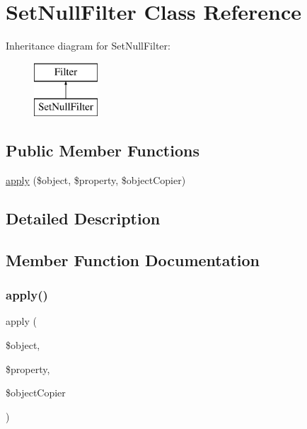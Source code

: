 \hypertarget{class_deep_copy_1_1_filter_1_1_set_null_filter}{}\section{Set\+Null\+Filter Class Reference}
\label{class_deep_copy_1_1_filter_1_1_set_null_filter}
Inheritance diagram for Set\+Null\+Filter\+:\begin{figure}[H]
\begin{center}
\leavevmode
\includegraphics[height=2.000000cm]{class_deep_copy_1_1_filter_1_1_set_null_filter}
\end{center}
\end{figure}
\subsection*{Public Member Functions}
\begin{DoxyCompactItemize}
\item 
\mbox{\hyperlink{class_deep_copy_1_1_filter_1_1_set_null_filter_a360932fe7f9488472623d76aa7da2a25}{apply}} (\$object, \$property, \$object\+Copier)
\end{DoxyCompactItemize}


\subsection{Detailed Description}


\subsection{Member Function Documentation}
\mbox{\label{class_deep_copy_1_1_filter_1_1_set_null_filter_a360932fe7f9488472623d76aa7da2a25}} 
\subsubsection{\texorpdfstring{apply()}{apply()}}
{\footnotesize\ttfamily apply (\begin{DoxyParamCaption}\item[{}]{\$object,  }\item[{}]{\$property,  }\item[{}]{\$object\+Copier }\end{DoxyParamCaption})}

